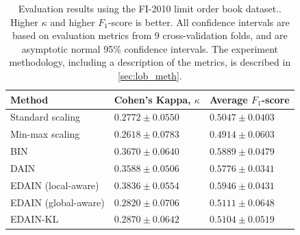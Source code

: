 \documentclass{statsmsc}
\begin{document}
{%
\begin{table}[htp]
    \centering
    \begin{tabular}{lll}
        \toprule
        Method & Cohen's Kappa, $\kappa$ & Average $F_1$-score \\
        \midrule
        Standard scaling & $0.2772 \pm 0.0550$ & $0.5047 \pm 0.0403$ \\
        Min-max scaling & $0.2618 \pm 0.0783$ & $0.4914 \pm 0.0603$ \\
        BIN & $0.3670 \pm 0.0640$ & $0.5889 \pm 0.0479$ \\
        DAIN & $0.3588 \pm 0.0506$ & $0.5776 \pm 0.0341$ \\
        EDAIN (local-aware) & $\bm{0.3836 \pm 0.0554}$ & $\bm{0.5946 \pm 0.0431}$ \\
        EDAIN (global-aware) & $0.2820 \pm 0.0706$ & $0.5111 \pm 0.0648$ \\
        EDAIN-KL & $0.2870 \pm 0.0642$ & $0.5104 \pm 0.0519$ \\
        \bottomrule
    \end{tabular}%
    \label{tab:lob_performance}%
    \caption{
        Evaluation results using the FI-2010 limit order book dataset..
        Higher $\kappa$ and higher $F_1$-score is better.
        All confidence intervals are based on evaluation metrics from 9 cross-validation folds,
        and are asymptotic normal 95\% confidence intervals.
        The experiment methodology, including a description of the metrics,
        is described in  \cref{sec:lob_meth}.
    }
\end{table}

}
\end{document}
